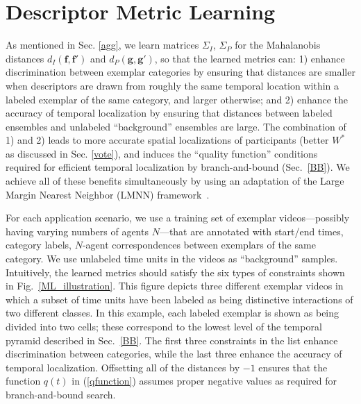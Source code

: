 
\section{Descriptor Metric Learning}
\label{MetLearn}
\vspace{-5pt}
As mentioned in Sec. \ref{agg}, we learn matrices $\Sigma_{I}$, $\Sigma_{P}$ for the Mahalanobis distances $d_I(\mathbf{f},\mathbf{f}')$ and $d_P(\mathbf{g},\mathbf{g}')$, so that the learned metrics can: 1) enhance discrimination between exemplar categories by ensuring that distances are smaller when descriptors are drawn from roughly the same temporal location within a labeled exemplar of the same category, and larger otherwise; and 2) enhance the accuracy of temporal localization by ensuring that distances between labeled ensembles and unlabeled ``background'' ensembles are large. The combination of 1) and 2) leads to more accurate spatial localizations of participants (\ie better $W^{*}$ as discussed in Sec. \ref{vote}), and induces the ``quality function'' conditions required for efficient temporal localization by branch-and-bound (Sec.~\ref{BB}). We achieve all of these benefits simultaneously by using an adaptation of the Large Margin Nearest Neighbor (LMNN) framework~\cite{Weinberger:ML}. 

For each application scenario, we use a training set of exemplar videos---possibly having varying numbers of agents $N$---that are annotated with start/end times, category labels, $N$-agent correspondences between exemplars of the same category. We use unlabeled time units in the videos as ``background'' samples. Intuitively, the learned metrics should satisfy the six types of constraints shown in Fig.~\ref{ML_illustration}. This figure depicts three different exemplar videos in which a subset of time units have been labeled as being distinctive interactions of two different classes. In this example, each labeled exemplar is shown as being divided into two cells; these correspond to the lowest level of the temporal pyramid described in Sec.~\ref{BB}. The first three constraints in the list enhance discrimination between categories, while the last three enhance the accuracy of temporal localization. Offsetting all of the distances by $-1$ ensures that the function $q(t)$ in (\ref{qfunction}) assumes proper negative values as required for branch-and-bound search. 

